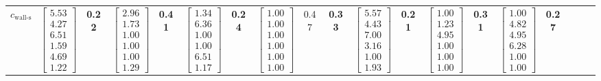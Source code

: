 \documentclass[conference]{IEEEtran}
\begin{document}
\begin{table}[tbh]
\begin{tabular}{l | cc cc cc cc c | cc cc cc cc c}
        $c_{\text{wall-s}}$
        & \multicolumn{1}{c}{$\begin{bmatrix} 5.53\\4.27\\6.51\\1.59\\4.69\\1.22 \end{bmatrix}$} & \textbf{0.22}
        & \multicolumn{1}{c}{$\begin{bmatrix} 2.96\\1.73\\1.00\\1.00\\1.00\\1.29 \end{bmatrix}$} & \textbf{0.41}
        & \multicolumn{1}{c}{$\begin{bmatrix} 1.34\\6.36\\1.00\\1.00\\6.51\\1.17 \end{bmatrix}$} & \textbf{0.24}
        & \multicolumn{1}{c}{$\begin{bmatrix} 1.00\\1.00\\1.00\\1.00\\1.00\\1.00 \end{bmatrix}$} & 0.47 & \textbf{0.33}
        & \multicolumn{1}{c}{$\begin{bmatrix} 5.57\\4.43\\7.00\\3.16\\1.00\\1.93 \end{bmatrix}$} & \textbf{0.21}
        & \multicolumn{1}{c}{$\begin{bmatrix} 1.00\\1.23\\4.95\\1.00\\1.00\\1.00 \end{bmatrix}$} & \textbf{0.31}
        & \multicolumn{1}{c}{$\begin{bmatrix} 1.00\\4.82\\4.95\\6.28\\1.00\\1.00 \end{bmatrix}$} & \textbf{0.27}

\end{tabular}
\end{table}
\end{document}
